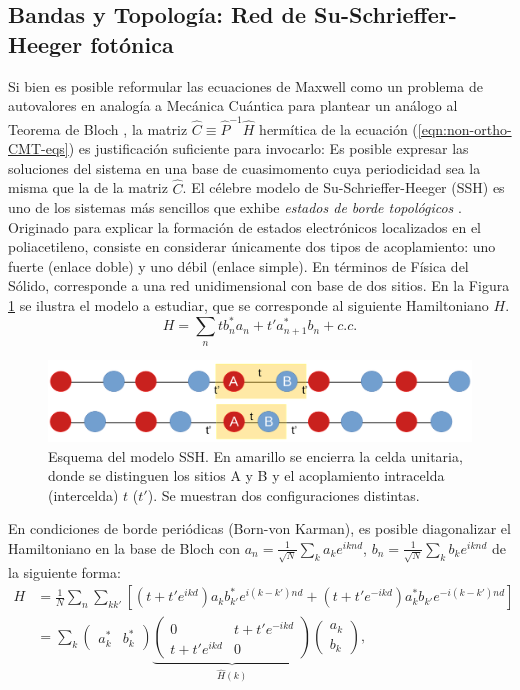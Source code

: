 \subsection{Bandas y Topología: Red de Su-Schrieffer-Heeger fotónica}

Si bien es posible reformular las ecuaciones de Maxwell como un problema de autovalores en analogía a Mecánica Cuántica para plantear un análogo al Teorema de Bloch \cite{joannopoulos_photonic_2008}, la matriz $\hat{C}\equiv\hat{P}^{-1}\hat{H}$ hermítica de la ecuación (\ref{eqn:non-ortho-CMT-eqs}) es justificación suficiente para invocarlo: Es posible expresar las soluciones del sistema en una base de cuasimomento cuya periodicidad sea la misma que la de la matriz $\hat{C}$.
El célebre modelo de Su-Schrieffer-Heeger (SSH) es uno de los sistemas más sencillos que exhibe \textit{estados de borde topológicos} \cite{ssh, ssh-photonic, topological-photonics}. Originado para explicar la formación de estados electrónicos localizados en el poliacetileno, consiste en considerar únicamente dos tipos de acoplamiento: uno fuerte (enlace doble) y uno débil (enlace simple). En términos de Física del Sólido, corresponde a una red unidimensional con base de dos sitios. En la Figura \ref{fig:ssh-model} se ilustra el modelo a estudiar, que se corresponde al siguiente Hamiltoniano $H$. 
\begin{equation*}
	H = \sum_n t b_n^*a_n + t'  a_{n+1}^*b_n  + c.c.
\end{equation*}
\begin{figure}[h]
\centering
	\includegraphics[width=\linewidth]{media/ssh-model.png}
	\caption[Esquema del modelo SSH.]{Esquema del modelo SSH. En amarillo se encierra la celda unitaria, donde se distinguen los sitios A y B y el acoplamiento intracelda (intercelda) $t$ ($t'$). Se muestran dos configuraciones distintas. \label{fig:ssh-model}}
\end{figure}
En condiciones de borde periódicas (Born-von Karman), es posible diagonalizar el Hamiltoniano en la base de Bloch con $a_n = \frac{1}{\sqrt{N}}\sum_k a_k e^{iknd}$, $b_n = \frac{1}{\sqrt{N}}\sum_k b_k e^{iknd}$ de la siguiente forma:
\begin{align*}
	H &= \frac{1}{N}\sum_n \sum_{k k'} \left[\left(t + t' e^{ikd}\right) a_k b_{k'}^* e^{i(k-k')nd}  + \left(t  + t' e^{-ikd}\right) a_k^* b_{k'} e^{-i(k-k')nd} \right]
	\\
	&=  \sum_k 
	\begin{pmatrix}
		a_k^* & b_k^*		
	\end{pmatrix}
	\underbrace{
	\begin{pmatrix}
		0 & t+ t'e^{-ikd}
		\\
		t+ t'e^{ikd} & 0
	\end{pmatrix}}_{\hat{H}(k)}
	\begin{pmatrix}
		a_k
		\\
		b_k		
	\end{pmatrix},
\end{align*}
